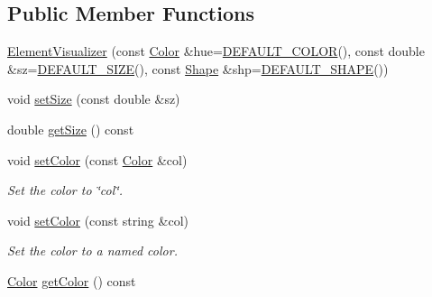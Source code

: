 \subsection*{Public Member Functions}
\begin{DoxyCompactItemize}
\item 
\mbox{\hyperlink{classbridges_1_1datastructure_1_1_element_visualizer_a8104e42b94927a9b45a237064d75ca33}{Element\+Visualizer}} (const \mbox{\hyperlink{classbridges_1_1datastructure_1_1_color}{Color}} \&hue=\mbox{\hyperlink{classbridges_1_1datastructure_1_1_element_visualizer_a777a0295e8216e403108a6c90ce6790b}{D\+E\+F\+A\+U\+L\+T\+\_\+\+C\+O\+L\+OR}}(), const double \&sz=\mbox{\hyperlink{classbridges_1_1datastructure_1_1_element_visualizer_afa0fa3f844171f311c3d9c9025a826c5}{D\+E\+F\+A\+U\+L\+T\+\_\+\+S\+I\+ZE}}(), const \mbox{\hyperlink{namespacebridges_1_1datastructure_a3408f5f44d9c6062e5f3adb7e1bbb7f0}{Shape}} \&shp=\mbox{\hyperlink{classbridges_1_1datastructure_1_1_element_visualizer_adfba1c4d4f04ff92545d932bfce5b9d1}{D\+E\+F\+A\+U\+L\+T\+\_\+\+S\+H\+A\+PE}}())
\item 
void \mbox{\hyperlink{classbridges_1_1datastructure_1_1_element_visualizer_a021333b1c20dd55627ac80ae3a2138e6}{set\+Size}} (const double \&sz)
\item 
double \mbox{\hyperlink{classbridges_1_1datastructure_1_1_element_visualizer_a5c83b976308b254521189280bfbfbc43}{get\+Size}} () const
\item 
void \mbox{\hyperlink{classbridges_1_1datastructure_1_1_element_visualizer_aabf1373100f7c45b71d0caf04427644f}{set\+Color}} (const \mbox{\hyperlink{classbridges_1_1datastructure_1_1_color}{Color}} \&col)
\begin{DoxyCompactList}\small\item\em Set the color to \char`\"{}col\char`\"{}. \end{DoxyCompactList}\item 
void \mbox{\hyperlink{classbridges_1_1datastructure_1_1_element_visualizer_a0068ebe250375b13c5b3d4af0df20dea}{set\+Color}} (const string \&col)
\begin{DoxyCompactList}\small\item\em Set the color to a named color. \end{DoxyCompactList}\item 
\mbox{\hyperlink{classbridges_1_1datastructure_1_1_color}{Color}} \mbox{\hyperlink{classbridges_1_1datastructure_1_1_element_visualizer_a611005282caa27575cf3ee7e3b1540c4}{get\+Color}} () const
\item 

\end{DoxyCompactItemize}
